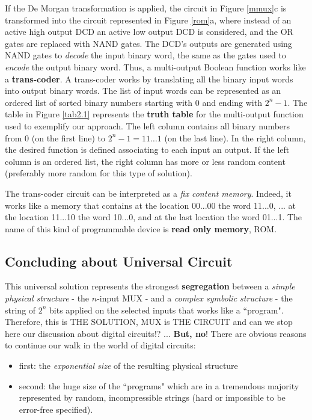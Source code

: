
If the De Morgan transformation is applied, the circuit in Figure
\ref{mmux}c is transformed into the circuit represented in Figure
\ref{rom}a, where instead of an active high output DCD an active
low output DCD is considered, and the OR gates are replaced
with NAND gates. The DCD's outputs are generated using NAND gates
to {\em decode} the input binary word, the same as the gates used
to {\em encode} the output binary word. Thus, a multi-output
Boolean function works like a {\bf trans-coder}. A trans-coder
works by translating all the binary input words into output binary
words. The list of input words can be represented as an ordered
list of sorted binary numbers starting with 0 and ending with
$2^{n}-1$. The table in Figure \ref{tab2.1} represents the {\bf
truth table} for the multi-output function used to exemplify our
approach. The left column contains all binary numbers from 0 (on
the first line) to $2^{n}-1 = 11 \ldots 1$ (on the last line).
In the right column, the desired function is defined associating to
each input an output. If the left column is an ordered list, the
right column has more or less random content (preferably more
random for this type of solution).


The trans-coder circuit can be interpreted as a {\em fix content
memory}. Indeed, it works like a memory that contains at the location
00...00 the word 11...0, ... at the location 11...10 the word
10...0, and at the last location the word 01...1. The name of this
kind of programmable device is {\bf read only memory}, ROM.





\subsection{Concluding about Universal Circuit}

This universal solution represents the strongest {\bf segregation}
between a {\em simple physical structure} - the $n$-input MUX -
and a {\em complex symbolic structure} - the string of $2^{n}$
bits applied on the selected inputs that works like a ``program".
Therefore, this is THE SOLUTION,  MUX is THE CIRCUIT and  can we
stop here our discussion about digital circuits!? ... {\bf But,
no}! There are obvious reasons to continue our walk in the world
of digital circuits:
\begin{itemize}
    \item first: the {\em exponential size} of the resulting physical structure
    \item second: the huge size of the ``programs" which are in a
    tremendous majority represented by random, incompressible
 strings (hard or impossible to be error-free specified).
\end{itemize}

